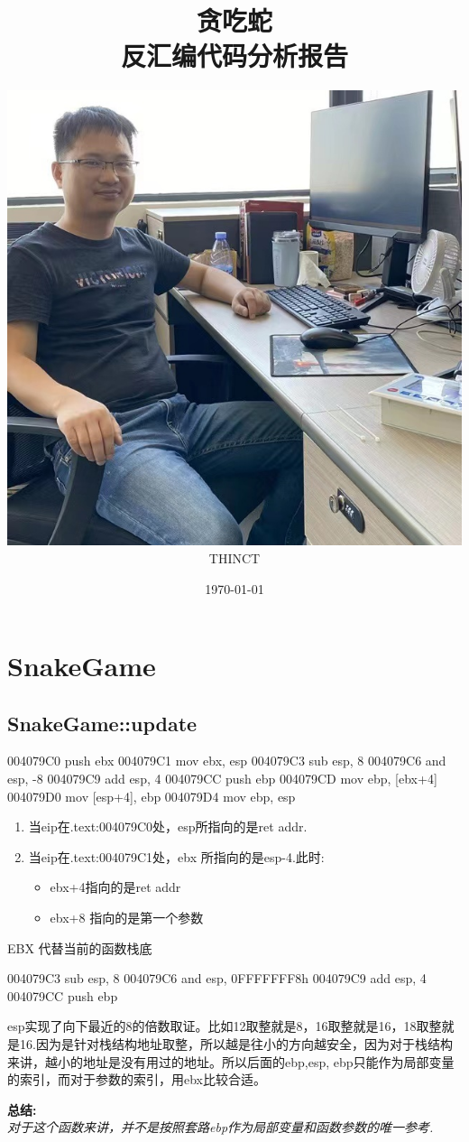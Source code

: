 \documentclass[AutoFakeBold,AutoFakeSlant]{beamer}
\title{\textbf{贪吃蛇}\\反汇编代码分析报告}
\date{\today}
\author{\includegraphics[width=0.26\linewidth]{ShowMe}\\THINCT}
\begin{document}
\maketitle

\section{SnakeGame}
\subsection{SnakeGame::update}

\begin{frame}[fragile]
    \begin{x86asmcode}
        004079C0  push  ebx
        004079C1  mov   ebx, esp
        004079C3  sub   esp, 8
        004079C6  and   esp, -8
        004079C9  add   esp, 4
        004079CC  push  ebp
        004079CD  mov   ebp, [ebx+4]
        004079D0  mov   [esp+4], ebp
        004079D4  mov   ebp, esp\end{x86asmcode}
    \begin{enumerate}
        \item 当eip在.text:004079C0处，esp所指向的是ret addr.
        \item 当eip在.text:004079C1处，ebx 所指向的是esp-4.此时:
              \begin{itemize}
                  \item ebx+4指向的是ret addr
                  \item ebx+8 指向的是第一个参数
              \end{itemize}
    \end{enumerate}
\end{frame}


\begin{frame}[fragile]{EBX 代替当前的函数栈底}
    \begin{x86asmcode}
        004079C3  sub   esp, 8
        004079C6  and   esp, 0FFFFFFF8h
        004079C9  add   esp, 4
        004079CC  push  ebp\end{x86asmcode}
    esp实现了向下最近的8的倍数取证。比如12取整就是8，16取整就是16，18取整就是16.因为是针对栈结构地址取整，所以越是往小的方向越安全，因为对于栈结构来讲，越小的地址是没有用过的地址。所以后面的ebp,esp, ebp只能作为局部变量的索引，而对于参数的索引，用ebx比较合适。

    \textbf {总结:}\\
    \emph {对于这个函数来讲，并不是按照套路ebp作为局部变量和函数参数的唯一参考.}
\end{frame}
\end{document}
